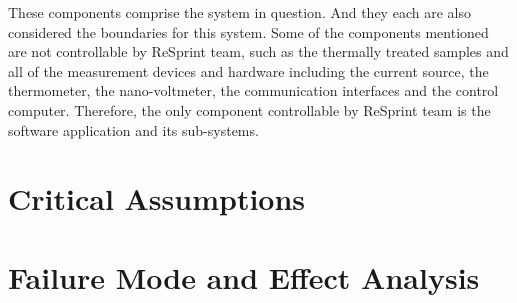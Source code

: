 \documentclass{article}
\begin{document}
\noindent These components comprise the system in question. And they each are also considered the boundaries for this system. Some of the components mentioned are not controllable by ReSprint team, such as the thermally treated samples and all of the measurement devices and hardware including the current source, the thermometer, the nano-voltmeter, the communication interfaces and the control computer. Therefore, the only component controllable by ReSprint team is the software application and its sub-systems.

\section{Critical Assumptions}



\section{Failure Mode and Effect Analysis}
\end{document}
